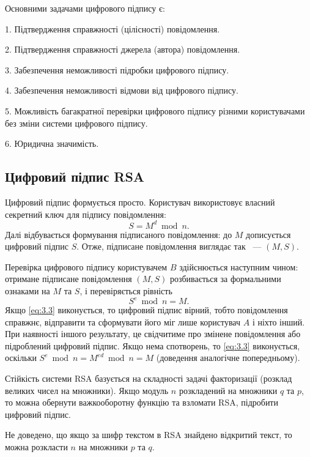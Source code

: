 Основними задачами цифрового підпису є:

\par1. Підтвердження справжності (цілісності) повідомлення.
\par2. Підтвердження справжності джерела (автора) повідомлення.
\par3. Забезпечення неможливості підробки цифрового підпису.
\par4. Забезпечення неможливості відмови від цифрового підпису.
\par5. Можливість багакратної перевірки цифрового підпису різними користувачами без зміни системи цифрового підпису. 
\par6. Юридична значимість.

\subsection{Цифровий підпис RSA}
Цифровий підпис формується просто. Користувач використовує власний секретний ключ для підпису повідомлення:
\begin{equation}
S = M ^d \bmod n.
\end{equation}
Далі відбувається формування підписаного повідомлення: до $M$ дописується цифровий підпис $S$. Отже, підписане повідомлення виглядає так ~--- $(M, S)$.

Перевірка цифрового підпису користувачем $B$ здійснюється наступним чином: отримане підписане повідомлення $(M, S)$ розбивається за формальними ознаками на $M$ та $S$, і перевіряється рівність 
\begin{equation} \label{eq:3.3} 
S ^ e \bmod n = M.
\end{equation}
Якщо \eqref{eq:3.3} виконується, то цифровий підпис вірний, тобто повідомлення справжнє, відправити та сформувати його міг лише користувач $A$ і ніхто інший. При наявності іншого результату, це свідчитиме про змінене повідомлення або підроблений цифровий підпис.
Якщо нема спотворень, то \eqref{eq:3.3} виконується, оскільки $S ^ e \bmod n = M ^ {ed} \bmod n = M$ (доведення аналогічне попередньому).

Стійкість системи RSA базується на складності задачі факторизації (розклад великих чисел на множники). Якщо модуль $n$ розкладений на множники $q$ та $p$, то можна обернути важкооборотну функцію та взломати RSA, підробити цифровий підпис.

Не доведено, що якщо за шифр текстом в RSA знайдено відкритий текст, то можна розкласти $n$ на множники $p$ та $q$.
